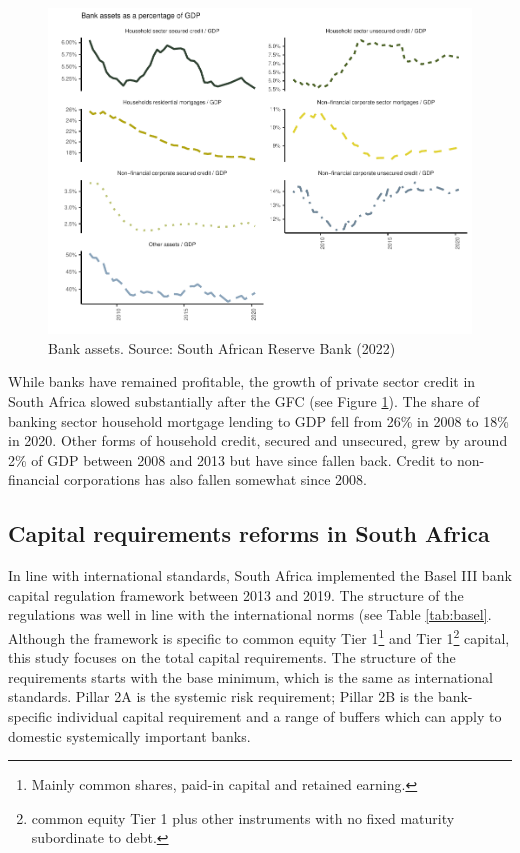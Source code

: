 \documentclass[
  12,
]{article}
\begin{document}
\begin{figure}[H]

\includegraphics{Bank_capital_and_bank_lending_files/figure-latex/assets-1} \hfill{}

\caption{Bank assets. Source: South African Reserve Bank (2022)}\label{fig:assets}
\end{figure}

While banks have remained profitable, the growth of private sector credit in South Africa slowed substantially after the GFC (see Figure \ref{fig:assets}). The share of banking sector household mortgage lending to GDP fell from 26\% in 2008 to 18\% in 2020. Other forms of household credit, secured and unsecured, grew by around 2\% of GDP between 2008 and 2013 but have since fallen back. Credit to non-financial corporations has also fallen somewhat since 2008.

\hypertarget{capital-requirements}{%
\subsection{Capital requirements reforms in South Africa}\label{capital-requirements}}

In line with international standards, South Africa implemented the Basel III bank capital regulation framework between 2013 and 2019. The structure of the regulations was well in line with the international norms (see Table \ref{tab:basel}. Although the framework is specific to common equity Tier 1\footnote{Mainly common shares, paid-in capital and retained earning.} and Tier 1\footnote{common equity Tier 1 plus other instruments with no fixed maturity subordinate to debt.} capital, this study focuses on the total capital requirements. The structure of the requirements starts with the base minimum, which is the same as international standards. Pillar 2A is the systemic risk requirement; Pillar 2B is the bank-specific individual capital requirement and a range of buffers which can apply to domestic systemically important banks.
\end{document}
